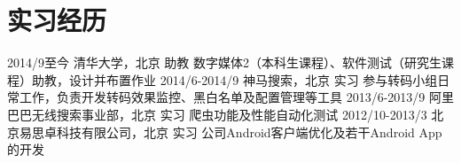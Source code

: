 \documentclass[]{friggeri-cv-cn}
\begin{document}

\section{实习经历}

\begin{entrylist}
  \entry
    {2014/9至今}
    {清华大学，北京}
    {助教}
    {数字媒体2（本科生课程）、软件测试（研究生课程）助教，设计并布置作业}
  \entry
    {2014/6-2014/9}
    {神马搜索，北京}
    {实习}
    {参与转码小组日常工作，负责开发转码效果监控、黑白名单及配置管理等工具}
  \entry
    {2013/6-2013/9}
    {阿里巴巴无线搜索事业部，北京}
    {实习}
    {爬虫功能及性能自动化测试}
  \entry
    {2012/10-2013/3}
    {北京易思卓科技有限公司，北京}
    {实习}
    {公司Android客户端优化及若干Android App的开发}
\end{entrylist}
\end{document}
